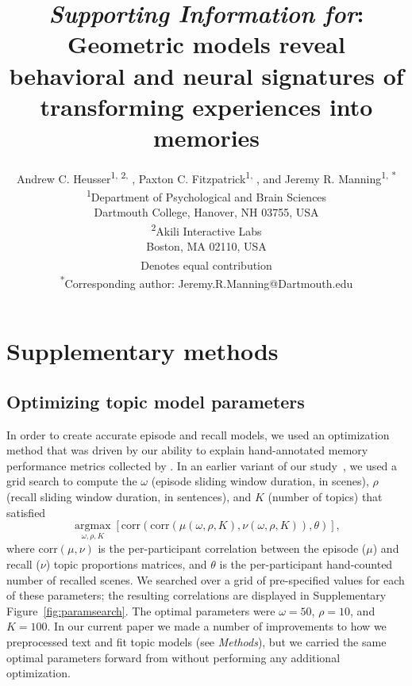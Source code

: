 \documentclass{article}
\title{\textit{Supporting Information for}: Geometric models reveal behavioral and neural signatures of transforming experiences into memories}
\author{Andrew C. Heusser\textsuperscript{1, 2, \textdagger}, Paxton C. Fitzpatrick\textsuperscript{1, \textdagger}, and Jeremy R. Manning\textsuperscript{1, *}\\\textsuperscript{1}Department of Psychological and Brain Sciences\\Dartmouth College, Hanover, NH 03755, USA\\\textsuperscript{2}Akili Interactive Labs\\Boston, MA 02110, USA\\\textsuperscript{\textdagger}Denotes equal contribution\\\textsuperscript{*}Corresponding author: Jeremy.R.Manning@Dartmouth.edu}
\newcommand{\argmax}{\mathop{\mathrm{argmax}}\limits}
\begin{document}
\renewcommand{\figurename}{Supplementary Figure}


\setcounter{equation}{0}
\setcounter{figure}{0}
\setcounter{table}{0}
\setcounter{page}{1}
\setcounter{section}{0}
\makeatletter
\renewcommand{\bibnumfmt}[1]{[S#1]}
\renewcommand{\citenumfont}[1]{S#1}



\section*{Supplementary methods}
\subsection*{Optimizing topic model parameters}
In order to create accurate episode and recall models, we used an optimization method that was driven by our ability to explain hand-annotated memory performance metrics collected by \cite{ChenEtal17}.  In an earlier variant of our study~\citep{HeusMann18}, we used a grid search to compute the $\omega$ (episode sliding window duration, in scenes), $\rho$ (recall sliding window duration, in sentences), and $K$ (number of topics) that satisfied
\[
\argmax_{\omega, \rho, K} \left[\mathrm{corr}\left(\mathrm{corr}\left(\mu\left(\omega, \rho, K\right), \nu\left(\omega, \rho, K\right)\right), \theta\right)\right],
\]
where $\mathrm{corr}(\mu, \nu)$ is the per-participant correlation between the episode ($\mu$) and recall ($\nu$) topic proportions matrices, and $\theta$ is the per-participant hand-counted number of recalled scenes.  We searched over a grid of pre-specified values for each of these parameters; the resulting correlations are displayed in Supplementary Figure~\ref{fig:paramsearch}.  The optimal parameters were $\omega = 50$, $\rho = 10$, and $K = 100$.  In our current paper we made a number of improvements to how we preprocessed text and fit topic models (see \textit{Methods}), but we carried the same optimal parameters forward from \cite{HeusMann18} without performing any additional optimization.
\end{document}
